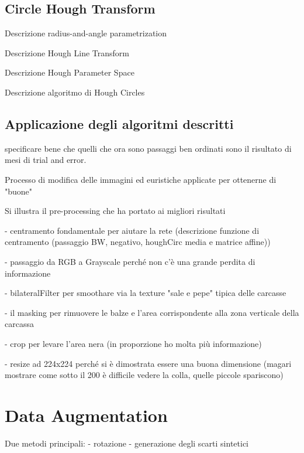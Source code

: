 
\clearpage
\subsection {Circle Hough Transform}
Descrizione radius-and-angle parametrization

Descrizione Hough Line Transform

Descrizione Hough Parameter Space

Descrizione algoritmo di Hough Circles





\subsection {Applicazione degli algoritmi descritti}
 specificare bene che quelli che ora sono passaggi ben ordinati sono il risultato di mesi di trial and error.

 Processo di modifica delle immagini ed euristiche applicate per ottenerne di "buone"

Si illustra il pre-processing che ha portato ai migliori risultati

- centramento fondamentale per aiutare la rete (descrizione funzione di centramento (passaggio BW, negativo, houghCirc media e matrice affine))

- passaggio da RGB a Grayscale perché non c'è una grande perdita di informazione

- bilateralFilter per smoothare via la texture "sale e pepe" tipica delle carcasse

- il masking per rimuovere le balze e l'area corrispondente alla zona verticale della carcassa

- crop per levare l'area nera (in proporzione ho molta più informazione)

- resize ad 224x224 perché si è dimostrata essere una buona dimensione (magari mostrare come sotto il 200 è difficile vedere la colla, quelle piccole spariscono)






\section {Data Augmentation}
Due metodi principali:
 - rotazione
 - generazione degli scarti sintetici

